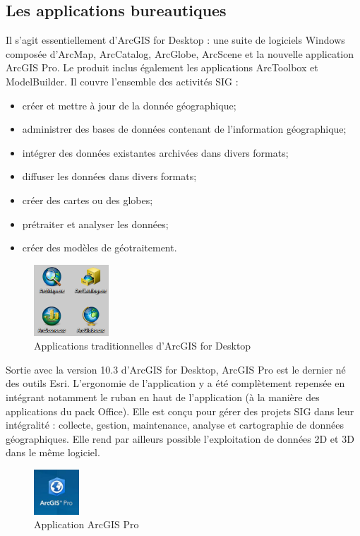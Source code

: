 \documentclass[11pt]{article}
\begin{document}
\subsection{Les applications bureautiques}
Il s'agit essentiellement d'ArcGIS for Desktop : une suite de logiciels Windows composée d'ArcMap, ArcCatalog, ArcGlobe, ArcScene et la nouvelle application ArcGIS Pro. Le produit inclus également les applications ArcToolbox et ModelBuilder. Il couvre l'ensemble des activités SIG : 
\begin{itemize}
	\item créer et mettre à jour de la donnée géographique;
	\item administrer des bases de données contenant de l'information géographique;
	\item intégrer des données existantes archivées dans divers formats;
	\item diffuser les données dans divers formats;
	\item créer des cartes ou des globes;
	\item prétraiter et analyser les données;
	\item créer des modèles de géotraitement.
\end{itemize}

\begin{figure}[!h]
	\center \includegraphics[width=0.25\textwidth]{img/cours/arcgis_for_desktop.png}
	\caption{Applications traditionnelles d'ArcGIS for Desktop}
\end{figure}

Sortie avec la version 10.3 d'ArcGIS for Desktop, ArcGIS Pro est le dernier né des outils Esri. L'ergonomie de l'application y a été complètement repensée en intégrant notamment le ruban en haut de l'application (à la manière des applications du pack Office). Elle est conçu pour gérer des projets SIG dans leur intégralité : collecte, gestion, maintenance, analyse et cartographie de données géographiques. Elle rend par ailleurs possible l'exploitation de données 2D et 3D dans le même logiciel.

\begin{figure}[!h]
	\center \includegraphics[width=0.15\textwidth]{img/cours/arcgis_pro.jpg}
	\caption{Application ArcGIS Pro}
\end{figure}
\end{document}
